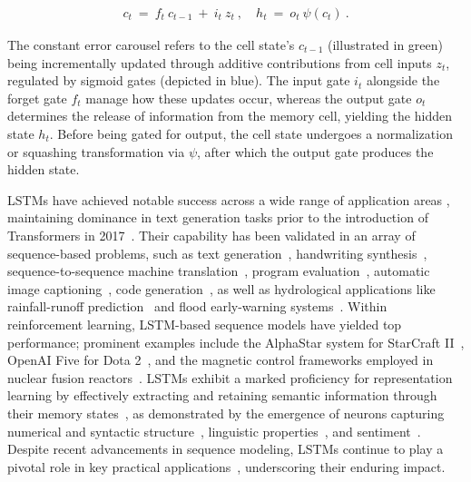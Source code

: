 \begin{align}
\label{eq:lstm_idea}
  c_t \ = \ f_t \ c_{t-1} \ + \ 
          i_t \  z_t \ , \quad  
          h_t \ = \ o_t \ \psi({c_t}) \ . 
\end{align}

The constant error carousel refers to the cell state's $c_{t-1}$ (illustrated in green) being incrementally updated through additive contributions from cell inputs $z_t$, regulated by sigmoid gates (depicted in blue). The input gate $i_t$ alongside the forget gate $f_t$ manage how these updates occur, whereas the output gate $o_t$ determines the release of information from the memory cell, yielding the hidden state $h_t$. Before being gated for output, the cell state undergoes a normalization or squashing transformation via $\psi$, after which the output gate produces the hidden state.

LSTMs have achieved notable success across a wide range of application areas \citep{Hochreiter:01,Hochreiter:07,Schmidhuber:15}, maintaining dominance in text generation tasks prior to the introduction of Transformers in 2017~\citep{Vaswani:17}. Their capability has been validated in an array of sequence-based problems, such as text generation~\citep{Graves:13,Karpathy:15blog}, handwriting synthesis~\citep{Graves:13}, sequence-to-sequence machine translation~\citep{Sutskever:14nips}, program evaluation~\citep{Zaremba:14arxiv}, automatic image captioning~\citep{Karpathy:15,Hossain:19}, code generation~\citep{Karpathy:15blog}, as well as hydrological applications like rainfall-runoff prediction~\citep{Kratzert:18,Kratzert:19} and flood early-warning systems~\citep{Nearing:24}. Within reinforcement learning, LSTM-based sequence models have yielded top performance; prominent examples include the AlphaStar system for StarCraft II~\citep{Vinyals:17short}, OpenAI Five for Dota 2~\citep{OpenAI:19}, and the magnetic control frameworks employed in nuclear fusion reactors~\citep{Degrave:22short}. LSTMs exhibit a marked proficiency for representation learning by effectively extracting and retaining semantic information through their memory states~\citep{Karpathy:15blog}, as demonstrated by the emergence of neurons capturing numerical and syntactic structure~\citep{Lakretz:19}, linguistic properties~\citep{Bau:19}, and sentiment~\citep{Radford:17arxiv}. Despite recent advancements in sequence modeling, LSTMs continue to play a pivotal role in key practical applications~\citep{Degrave:22short,Nearing:24}, underscoring their enduring impact.

